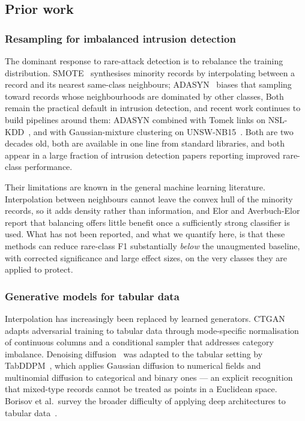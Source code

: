 \documentclass[11pt]{article}
\begin{document}
\subsection*{Prior work}
\subsubsection*{Resampling for imbalanced intrusion detection}

The dominant response to rare-attack detection is to rebalance the training
distribution. SMOTE~\cite{chawla2002smote} synthesises minority records by
interpolating between a record and its nearest same-class neighbours;
ADASYN~\cite{he2008adasyn} biases that sampling toward records whose neighbourhoods are dominated by other classes, Both remain the practical default in intrusion detection, and recent work continues to build pipelines around them: ADASYN combined with Tomek links on NSL-KDD~\cite{abdelkhalek2023addressing}, and with Gaussian-mixture clustering on UNSW-NB15~\cite{chen2024overcoming}. Both are two decades old, both are available in one
line from standard libraries, and both appear in a large fraction of intrusion
detection papers reporting improved rare-class performance.

Their limitations are known in the general machine learning literature. Interpolation
between neighbours cannot leave the convex hull of the minority records, so it adds
density rather than information, and Elor and Averbuch-Elor~\cite{elor2022smote}
report that balancing offers little benefit once a sufficiently strong classifier is
used. What has not been reported, and what we quantify here, is that these methods
can reduce rare-class F1 substantially \emph{below} the unaugmented baseline, with
corrected significance and large effect sizes, on the very classes they are applied
to protect.

\subsubsection*{Generative models for tabular data}

Interpolation has increasingly been replaced by learned generators.
CTGAN~\cite{xu2019modeling} adapts adversarial training to tabular data through
mode-specific normalisation of continuous columns and a conditional sampler that
addresses category imbalance. Denoising diffusion~\cite{ho2020denoising} was adapted
to the tabular setting by TabDDPM~\cite{kotelnikov2023tabddpm}, which applies
Gaussian diffusion to numerical fields and multinomial diffusion to categorical and
binary ones --- an explicit recognition that mixed-type records cannot be treated as points in a Euclidean space. Borisov et al.\ survey the broader difficulty of applying deep architectures to tabular data~\cite{borisov2024deep}.
\end{document}
